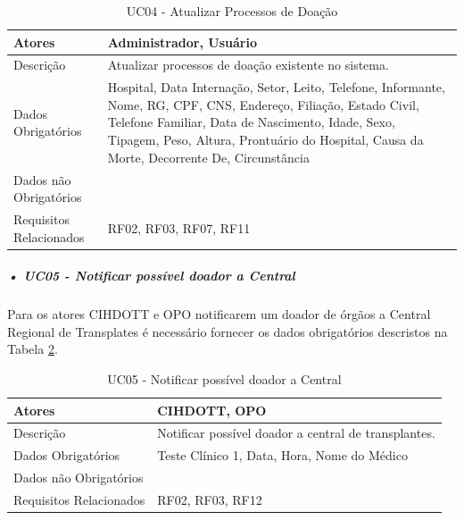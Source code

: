 \documentclass[portuguese,oneside]{tcc}
\begin{document}
\begin{table}
\centering
\caption{UC04 - Atualizar Processos de Doação} \label{table:uc04}
\begin{tabular}{ |p{5cm}|p{5cm}|  }
\hline
Atores & 
Administrador, Usuário\\

\hline
Descrição & 
 
Atualizar processos de doação existente no sistema.
 \\

\hline
Dados Obrigatórios & 
Hospital, Data Internação, Setor, Leito, Telefone, Informante, Nome, RG, CPF, CNS, Endereço, Filiação, Estado Civil, Telefone Familiar, Data de Nascimento, Idade, Sexo, Tipagem, Peso, Altura, Prontuário do Hospital, Causa da Morte, Decorrente De, Circunstância
 \\

\hline
Dados não Obrigatórios & 
 \\

\hline
Requisitos Relacionados & 
RF02, RF03, RF07, RF11
 \\

\hline
\end{tabular}
\end{table}



\subparagraph{• UC05 - Notificar possível doador a Central}
Para os atores CIHDOTT e OPO notificarem um doador de órgãos a Central Regional de Transplates é necessário fornecer os dados obrigatórios descristos na Tabela \ref{table:uc05}. 

\begin{table}
\centering
\caption{UC05 - Notificar possível doador a Central} \label{table:uc05}
\begin{tabular}{ |p{5cm}|p{5cm}|  }

\hline
Atores & 
CIHDOTT, OPO\\

\hline
Descrição & 
 
Notificar possível doador a central de transplantes.
 \\

\hline
Dados Obrigatórios & 
Teste Clínico 1, Data, Hora, Nome do Médico
 \\

\hline
Dados não Obrigatórios & 
 \\

\hline
Requisitos Relacionados & 
RF02, RF03, RF12
 \\

\hline

\end{tabular}
\end{table}
\end{document}
